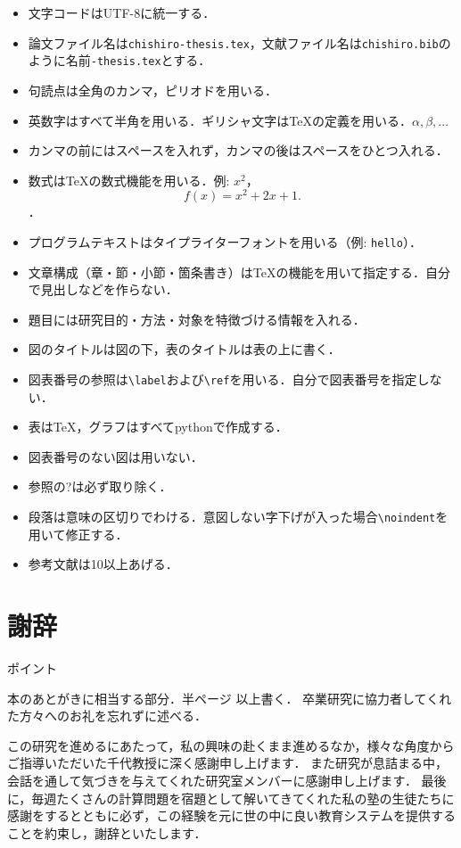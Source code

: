 \documentclass[a4j,11pt,report]{jsbook}
\newcommand{\point}[1]{
\begin{itembox}[l]{ポイント}
  #1
\end{itembox}
}
\begin{document}
\begin{itemize}
  \item 文字コードはUTF-8に統一する．
  \item 論文ファイル名は\texttt{chishiro-thesis.tex}，文献ファイル名は\texttt{chishiro.bib}のように名前\texttt{-thesis.tex}とする．
  \item 句読点は全角のカンマ，ピリオドを用いる．
  \item 英数字はすべて半角を用いる．ギリシャ文字は{\TeX}の定義を用いる．$\alpha, \beta, ...$
  \item カンマの前にはスペースを入れず，カンマの後はスペースをひとつ入れる．
  \item 数式は{\TeX}の数式機能を用いる．例: $x^2$，\[f(x) = x^2 + 2x + 1.\]．
  \item プログラムテキストはタイプライターフォントを用いる（例: \texttt{hello}）．
  \item 文章構成（章・節・小節・箇条書き）は{\TeX}の機能を用いて指定する．自分で見出しなどを作らない．
  \item 題目には研究目的・方法・対象を特徴づける情報を入れる．
  \item 図のタイトルは図の下，表のタイトルは表の上に書く．
  \item 図表番号の参照は\verb#\label#および\verb#\ref#を用いる．自分で図表番号を指定しない．
  \item 表は{\TeX}，グラフはすべてpythonで作成する．
  \item 図表番号のない図は用いない．
  \item 参照の?は必ず取り除く．
  \item 段落は意味の区切りでわける．意図しない字下げが入った場合\verb#\noindent#を用いて修正する．
  \item 参考文献は10以上あげる．
\end{itemize}
\fi


\chapter*{謝辞 \label{ch:acknowledgement}}
\thispagestyle{empty}
\if
\point{
本のあとがきに相当する部分．半ページ 以上書く．
卒業研究に協力者してくれた方々へのお礼を忘れずに述べる．
}
\fi
この研究を進めるにあたって，私の興味の赴くまま進めるなか，様々な角度からご指導いただいた千代教授に深く感謝申し上げます．
また研究が息詰まる中，会話を通して気づきを与えてくれた研究室メンバーに感謝申し上げます．
最後に，毎週たくさんの計算問題を宿題として解いてきてくれた私の塾の生徒たちに感謝をするとともに必ず，この経験を元に世の中に良い教育システムを提供することを約束し，謝辞といたします．




\end{document}
